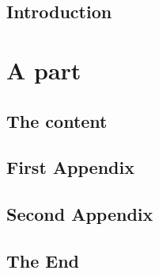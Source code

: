 \documentclass{book}
\begin{document}
\frontmatter
\chapter{Introduction}
\lipsum
	
\mainmatter
\part{A part}
\chapter{The content}
\lipsum

\appendix
\chapter{First Appendix}
\lipsum
\chapter{Second Appendix}
\lipsum

\backmatter
\chapter{The End}
\lipsum
\end{document}

